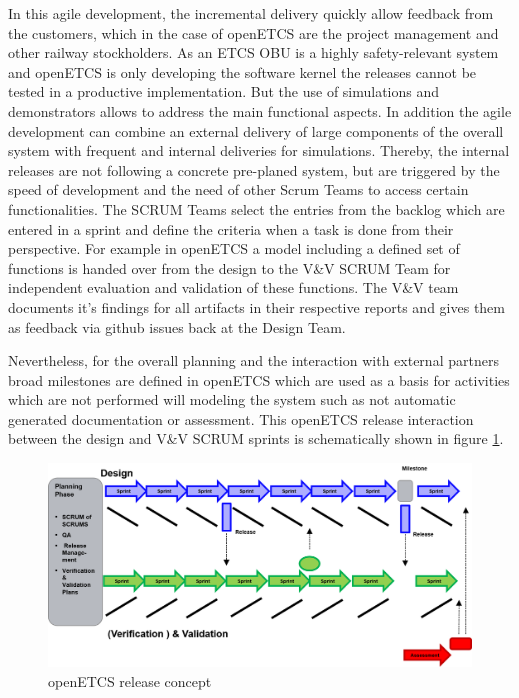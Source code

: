In this agile development, the incremental delivery quickly allow feedback from the customers, which in the case of openETCS are the project management and other railway stockholders. As an ETCS OBU is a highly safety-relevant system and openETCS is only developing the software kernel the releases cannot be tested in a productive implementation. But the use of simulations and demonstrators allows to address the main functional aspects. In addition the agile development can combine an external delivery of large components of the overall system with frequent and internal deliveries for simulations. Thereby, the internal releases are not following a concrete pre-planed system, but are triggered by the speed of development and the need of other Scrum Teams to access certain functionalities. The SCRUM Teams select the entries from the backlog which are entered in a sprint and define the criteria when a task is done from their perspective. For example in openETCS a model including a defined set of functions is handed over from the design to the V\&V SCRUM Team for independent evaluation and validation of these functions. The V\&V team documents it's findings for all artifacts in their respective reports and gives them as feedback via github issues back at the Design Team.  

Nevertheless, for the overall planning and the interaction with external partners broad milestones are defined in openETCS which are used as a basis for activities which are not performed will modeling the system such as not automatic generated documentation or assessment. This openETCS release interaction between the design and V\&V SCRUM sprints is schematically shown in figure \ref{fig:openETCSReleases}.

\begin{figure}[hbt]
\centering
\includegraphics[width=0.95\linewidth]{./images/openETCS_release-concept}
\caption{openETCS release concept}
\label{fig:openETCSReleases}
\end{figure}

